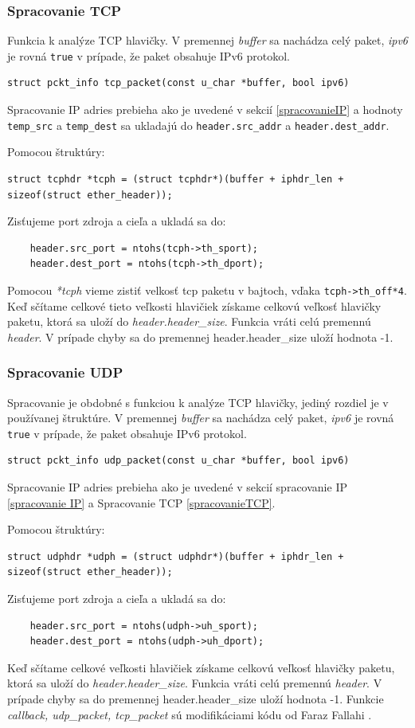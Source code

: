 \documentclass[11pt, a4paper]{article}
\begin{document}
	\subsubsection{Spracovanie TCP}
	Funkcia k analýze TCP hlavičky. V premennej \emph{buffer} sa nachádza celý paket, \emph{ipv6} je rovná \texttt{true} v prípade, že paket obsahuje IPv6 protokol. 
	\begin{lstlisting}
struct pckt_info tcp_packet(const u_char *buffer, bool ipv6)
	\end{lstlisting}
	\label{spracovanieTCP}
	Spracovanie IP adries prebieha ako je uvedené v sekcií \ref{spracovanieIP} a hodnoty \texttt{temp\_src} a \texttt{temp\_dest} sa ukladajú do \texttt{header.src\_addr} a \texttt{header.dest\_addr}. 
	
	Pomocou štruktúry: 
	\begin{lstlisting}
struct tcphdr *tcph = (struct tcphdr*)(buffer + iphdr_len + sizeof(struct ether_header));
	\end{lstlisting}
Zisťujeme port zdroja a cieľa a ukladá sa do:
	\begin{lstlisting}
	header.src_port = ntohs(tcph->th_sport);
	header.dest_port = ntohs(tcph->th_dport);
	\end{lstlisting}
Pomocou \emph{*tcph} vieme zistiť velkosť tcp paketu v bajtoch, vďaka \texttt{tcph->th\_off*4}.
Keď sčítame celkové tieto veľkosti hlavičiek získame celkovú veľkosť hlavičky paketu, ktorá sa uloží do \emph{header.header\_size}. Funkcia vráti celú premennú \emph{header}. V prípade chyby sa do premennej header.header\_size uloží hodnota -1.

	\subsubsection{Spracovanie UDP}
	Spracovanie je obdobné s funkciou k analýze TCP hlavičky, jediný rozdiel je v používanej štruktúre. V premennej \emph{buffer} sa nachádza celý paket, \emph{ipv6} je rovná \texttt{true} v prípade, že paket obsahuje IPv6 protokol. 
	\begin{lstlisting}
struct pckt_info udp_packet(const u_char *buffer, bool ipv6)
	\end{lstlisting}
	Spracovanie IP adries prebieha ako je uvedené v sekcií spracovanie IP \ref{spracovanie IP} a Spracovanie TCP \ref{spracovanieTCP}.
	
	Pomocou štruktúry: 
	\begin{lstlisting}
struct udphdr *udph = (struct udphdr*)(buffer + iphdr_len + sizeof(struct ether_header));   
	\end{lstlisting}
Zisťujeme port zdroja a cieľa a ukladá sa do:
	\begin{lstlisting}
	header.src_port = ntohs(udph->uh_sport);
	header.dest_port = ntohs(udph->uh_dport);
	\end{lstlisting}
Keď sčítame celkové veľkosti hlavičiek získame celkovú veľkosť hlavičky paketu, ktorá sa uloží do \emph{header.header\_size}. Funkcia vráti celú premennú \emph{header}. V prípade chyby sa do premennej header.header\_size uloží hodnota -1. Funkcie \emph{callback, udp\_packet, tcp\_packet} sú modifikáciami kódu od Faraz Fallahi \cite{FarazFallahi}.
\end{document}
